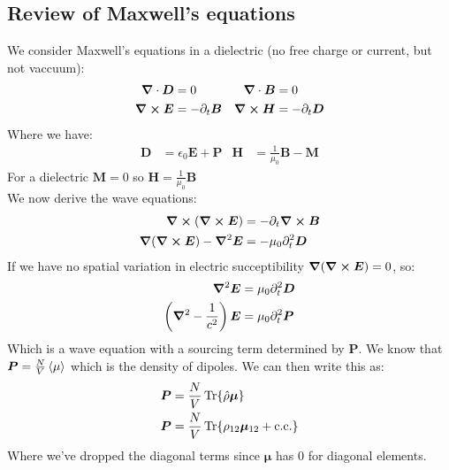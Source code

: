 \subsection{Review of Maxwell's equations}
We consider Maxwell's equations in a dielectric (no free charge or current, but not vaccuum):
\begin{align*}
	\bm{\nabla}\cdot\bm{D} &= 0 &
	\bm{\nabla}\cdot\bm{B} &= 0 \\
	\bm{\nabla}\cross\bm{E} &= -\partial_t\bm{B} &
	\bm{\nabla}\cross\bm{H} &= -\partial_t\bm{D}
\end{align*}
Where we have:
\begin{align*}
	\bm{D} &= \epsilon_0\bm{E} + \bm{P} &
	\bm{H} &= \frac{1}{\mu_0}\bm{B} - \bm{M}
\end{align*}
For a dielectric $\bm{M} = 0$ so $\bm{H} = \frac{1}{\mu_0}\bm{B}$ \\
We now derive the wave equations:
\begin{align*}
	\bm{\nabla}\cross(\bm{\nabla}\cross\bm{E}) &= -\partial_t\bm{\nabla}\cross\bm{B} \\
	\bm{\nabla}(\bm{\nabla}\cross\bm{E}) - \bm{\nabla}^2\bm{E}  &= -\mu_0\partial_t^2\bm{D}
\end{align*}
If we have no spatial variation in electric succeptibility $\bm{\nabla}(\bm{\nabla}\cross\bm{E}) =0$, so:
\begin{align*}
	\bm{\nabla}^2\bm{E}  &= \mu_0\partial_t^2\bm{D} \\
	\left(\bm{\nabla}^2 - \frac{1}{c^2}\right)\bm{E} &= \mu_0\partial_t^2\bm{P}
\end{align*}
Which is a wave equation with a sourcing term determined by $\bm{P}$. We know that $\bm{P} = \frac{N}{V} \expval{\mu}$ which is the density of dipoles. We can then write this as:
\begin{align*}
	\bm{P} &= \frac{N}{V} \Tr{\hat{\rho}\bm{\mu}} \\
	\bm{P} &= \frac{N}{V} \Tr{\rho_{12}\bm{\mu}_{12} + \text{c.c.}}
\end{align*}
Where we've dropped the diagonal terms since $\bm{\mu}$ has $0$ for diagonal elements. \\
